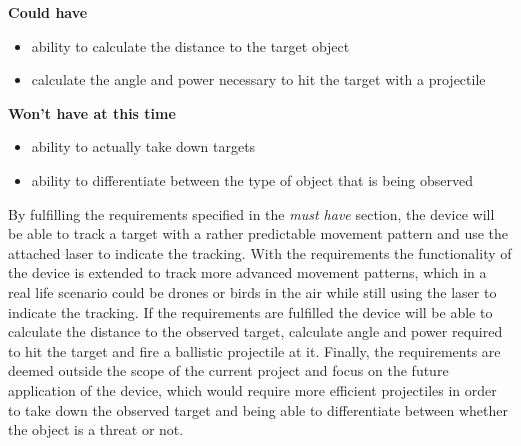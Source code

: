 \textbf{Could have}
\begin{itemize}
\item ability to calculate the distance to the target object
\item calculate the angle and power necessary to hit the target with a projectile
\end{itemize}

\textbf{Won't have at this time}
\begin{itemize}
\item ability to actually take down targets
\item ability to differentiate between the type of object that is being observed
\end{itemize}

By fulfilling the requirements specified in the \textit{must have} section, the device will be able to track a target with a rather predictable movement pattern and use the attached laser to indicate the tracking. 
With the  requirements the functionality of the device is extended to track more advanced movement patterns, which in a real life scenario could be drones or birds in the air while still using the laser to indicate the tracking.
If the  requirements are fulfilled the device will be able to calculate the distance to the observed target, calculate angle and power required to hit the target and fire a ballistic projectile at it.
Finally, the  requirements are deemed outside the scope of the current project and focus on the future application of the device, which would require more efficient projectiles in order to take down the observed target and being able to differentiate between whether the object is a threat or not.